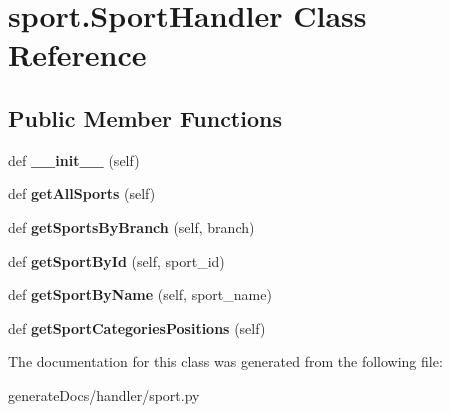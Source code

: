 \hypertarget{classsport_1_1_sport_handler}{}\section{sport.\+Sport\+Handler Class Reference}
\label{classsport_1_1_sport_handler}
\subsection*{Public Member Functions}
\begin{DoxyCompactItemize}
\item 
\mbox{\label{classsport_1_1_sport_handler_a0d3de4cdd425723c85bab643a72bc31d}} 
def {\bfseries \+\_\+\+\_\+init\+\_\+\+\_\+} (self)
\item 
\mbox{\label{classsport_1_1_sport_handler_aea6a1784f6abd00a6b0f5ed56affae7d}} 
def {\bfseries get\+All\+Sports} (self)
\item 
\mbox{\label{classsport_1_1_sport_handler_ad62c3e0c1eee109e67bed0c7f59493ac}} 
def {\bfseries get\+Sports\+By\+Branch} (self, branch)
\item 
\mbox{\label{classsport_1_1_sport_handler_a6d05a22638c9c3ca98d152e8ff4ce26f}} 
def {\bfseries get\+Sport\+By\+Id} (self, sport\+\_\+id)
\item 
\mbox{\label{classsport_1_1_sport_handler_ad80f625a7b7efd4227d276243081cb39}} 
def {\bfseries get\+Sport\+By\+Name} (self, sport\+\_\+name)
\item 
\mbox{\label{classsport_1_1_sport_handler_a31f4c9ef065b214f5ba06a83ae95a126}} 
def {\bfseries get\+Sport\+Categories\+Positions} (self)
\end{DoxyCompactItemize}


The documentation for this class was generated from the following file\+:\begin{DoxyCompactItemize}
\item 
generate\+Docs/handler/sport.\+py\end{DoxyCompactItemize}
